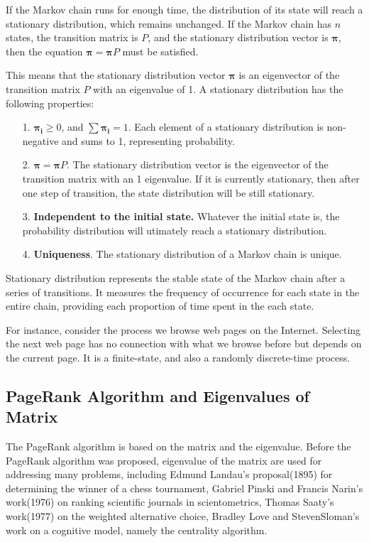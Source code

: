 \documentclass[lettersize,journal,12pt,conference]{IEEEtran}
\begin{document}
If the Markov chain runs for enough time, the distribution of its state will reach a stationary distribution, which remains unchanged. If the Markov chain has $n$ states, the transition matrix is $P$, and the stationary distribution vector is $\boldsymbol{\pi}$, then the equation $\boldsymbol{\pi} = \boldsymbol{\pi} P$ must be satisfied.

This means that the stationary distribution vector $\boldsymbol{\pi}$ is an eigenvector of the transition matrix $P$ with an eigenvalue of 1. A stationary distribution has the following properties:
\begin{enumerate}
	\item [1.] $\boldsymbol{\pi_i}\geq0$, and $\sum\boldsymbol{\pi_i}=1$. Each element of a stationary distribution is non-negative and sums to 1, representing probability.
	\item [2.] $\boldsymbol{\pi} = \boldsymbol{\pi} P$. The stationary distribution vector is the eigenvector of the transition matrix with an 1 eigenvalue. If it is currently stationary, then after one step of transition, the state distribution will be still stationary.
	\item [3.] \textbf{Independent to the initial state.} Whatever the initial state is, the probability distribution will utimately reach a stationary distribution.
	\item [4.] \textbf{Uniqueness}. The stationary distribution of a Markov chain is unique.
\end{enumerate}

Stationary distribution represents the stable state of the Markov chain after a series of transitions.
It measures the frequency of occurrence for each state in the entire chain, providing each proportion of time spent in the each state.

For instance, consider the process we browse web pages on the Internet. Selecting the next web page has no connection with what we browse before but depends on the current page.
It is a finite-state, and also a randomly discrete-time process.

\subsection{PageRank Algorithm and Eigenvalues of Matrix}

The PageRank algorithm is based on the matrix and the eigenvalue. Before the PageRank algorithm was proposed, eigenvalue of the matrix are used for addressing many problems, including Edmund Landau's proposal(1895) for determining the winner of a chess tournament, Gabriel Pinski and Francis Narin's work(1976) on ranking scientific journals in scientometrics, Thomas Saaty's work(1977) on the weighted alternative choice, Bradley Love and StevenSloman's work on a cognitive model, namely the centrality algorithm.
\end{document}
